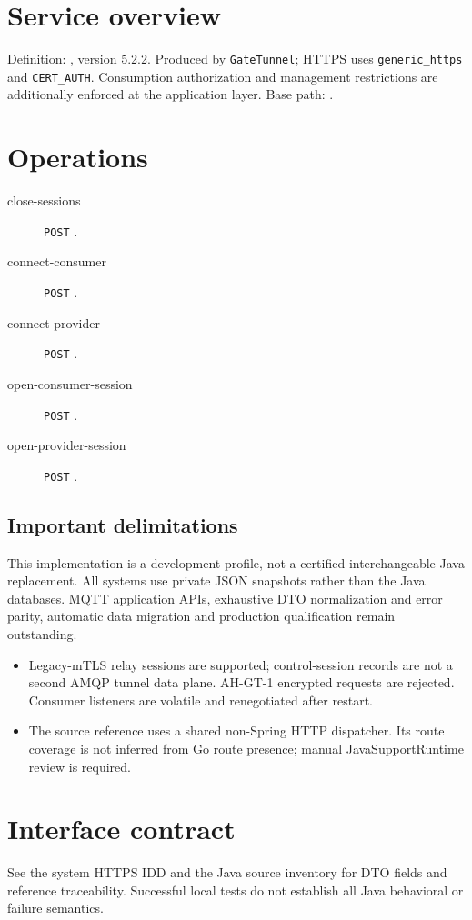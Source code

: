 \documentclass[a4paper]{arrowhead}
\begin{document}
\ArrowheadSetup
\section{Service overview}
Definition: , version 5.2.2. Produced by \texttt{GateTunnel}; HTTPS uses \texttt{generic\_https} and \texttt{CERT\_AUTH}. Consumption authorization and management restrictions are additionally enforced at the application layer. Base path: .
\section{Operations}
\begin{description}
\item[close-sessions] \texttt{POST} .
\item[connect-consumer] \texttt{POST} .
\item[connect-provider] \texttt{POST} .
\item[open-consumer-session] \texttt{POST} .
\item[open-provider-session] \texttt{POST} .
\end{description}
\subsection{Important delimitations}
This implementation is a development profile, not a certified interchangeable Java replacement. All systems use private JSON snapshots rather than the Java databases. MQTT application APIs, exhaustive DTO normalization and error parity, automatic data migration and production qualification remain outstanding.
\begin{itemize}
\item Legacy-mTLS relay sessions are supported; control-session records are not a second AMQP tunnel data plane. AH-GT-1 encrypted requests are rejected. Consumer listeners are volatile and renegotiated after restart.
\item The source reference uses a shared non-Spring HTTP dispatcher. Its route coverage is not inferred from Go route presence; manual JavaSupportRuntime review is required.
\end{itemize}
\section{Interface contract}
See the system HTTPS IDD and the Java source inventory for DTO fields and reference traceability. Successful local tests do not establish all Java behavioral or failure semantics.
\end{document}
